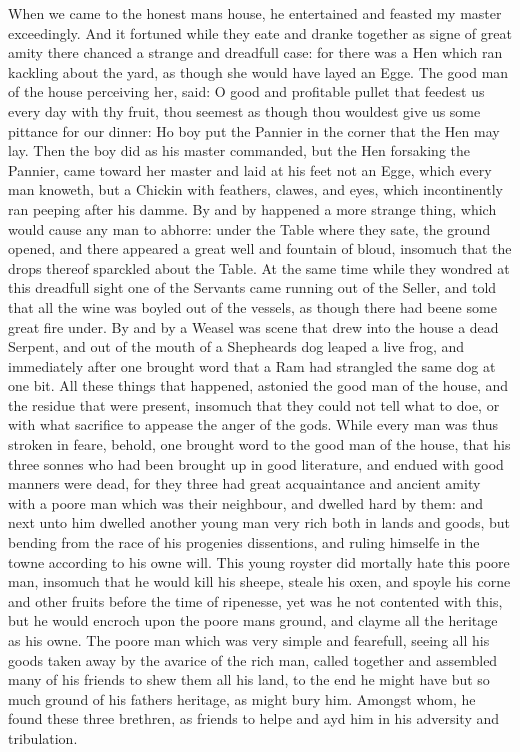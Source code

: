 When we came to the honest mans house, he entertained and feasted my master
exceedingly. And it fortuned while they eate and dranke together as signe of
great amity there chanced a strange and dreadfull case: for there was a Hen
which ran kackling about the yard, as though she would have layed an Egge. The
good man of the house perceiving her, said: O good and profitable pullet that
feedest us every day with thy fruit, thou seemest as though thou wouldest give
us some pittance for our dinner: Ho boy put the Pannier in the corner that the
Hen may lay. Then the boy did as his master commanded, but the Hen forsaking
the Pannier, came toward her master and laid at his feet not an Egge, which
every man knoweth, but a Chickin with feathers, clawes, and eyes, which
incontinently ran peeping after his damme. By and by happened a more strange
thing, which would cause any man to abhorre: under the Table where they sate,
the ground opened, and there appeared a great well and fountain of bloud,
insomuch that the drops thereof sparckled about the Table. At the same time
while they wondred at this dreadfull sight one of the Servants came running out
of the Seller, and told that all the wine was boyled out of the vessels, as
though there had beene some great fire under. By and by a Weasel was scene that
drew into the house a dead Serpent, and out of the mouth of a Shepheards dog
leaped a live frog, and immediately after one brought word that a Ram had
strangled the same dog at one bit. All these things that happened, astonied the
good man of the house, and the residue that were present, insomuch that they
could not tell what to doe, or with what sacrifice to appease the anger of the
gods. While every man was thus stroken in feare, behold, one brought word to
the good man of the house, that his three sonnes who had been brought up in
good literature, and endued with good manners were dead, for they three had
great acquaintance and ancient amity with a poore man which was their
neighbour, and dwelled hard by them: and next unto him dwelled another young
man very rich both in lands and goods, but bending from the race of his
progenies dissentions, and ruling himselfe in the towne according to his owne
will. This young royster did mortally hate this poore man, insomuch that he
would kill his sheepe, steale his oxen, and spoyle his corne and other fruits
before the time of ripenesse, yet was he not contented with this, but he would
encroch upon the poore mans ground, and clayme all the heritage as his owne.
The poore man which was very simple and fearefull, seeing all his goods taken
away by the avarice of the rich man, called together and assembled many of his
friends to shew them all his land, to the end he might have but so much ground
of his fathers heritage, as might bury him. Amongst whom, he found these three
brethren, as friends to helpe and ayd him in his adversity and tribulation.

